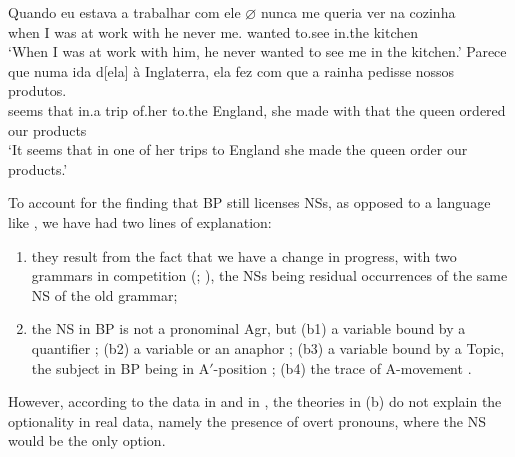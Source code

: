 \documentclass[output=paper]{langsci/langscibook}
\begin{document}
\begin{enumerate}[label=(\alph*)]
\ea%
    \label{ex:26.21}
    \ea
	\gll	Quando eu estava a trabalhar com ele \textbf{$\varnothing$} nunca me     queria ver na cozinha\\
            when     I   was     at work       with he {} never  me.\Cl{} wanted to.see in.the kitchen\\
	\glt	\enquote*{When I was at work with him, he never wanted to see me in the kitchen.}
    \ex
	\gll	Parece que numa ida d[ela]     à   Inglaterra, ela fez     com que   a rainha pedisse nossos produtos.\\
			seems   that in.a   trip of.her to.the England,    she made with that  the queen ordered our products\\
	\glt	\enquote*{It seems that in one of her trips to England she made the queen order our products.}
    \z
\z
\end{enumerate}

To account for the finding that \gls{BP} still
licenses NSs, as opposed to a language like , we have had two
lines of explanation:

\begin{enumerate}[label=(\alph*)]
\item they result from the fact that we have a change in progress,
with two grammars in competition (\citealt{Duarte1993,Duarte1995};
\citealt{Kato2000}), the NSs being residual occurrences of the  same NS of the
old grammar;

\item the NS in \gls{BP} is not a
pronominal Agr,  but (b1) a variable bound by a quantifier
\parencite{NegraoMuller1996}; (b2) a variable or an anaphor
\parencite{FigueiredoSilva2000}; (b3) a variable bound by a Topic, the subject
in \gls{BP} being in A$'$-position \citep{Modesto2000};
(b4) the trace of A-movement
\parencite{Ferreira2004,Rodrigues2004,MartinsNunes2010}.
\end{enumerate}

However, according to the data in \textcite{BarbosaDuarteKato2005} and in
\citet{Kato2009}, the theories in (b) do not explain the optionality in real
data, namely the presence of overt pronouns, where the NS would be the only
option.
\end{document}
